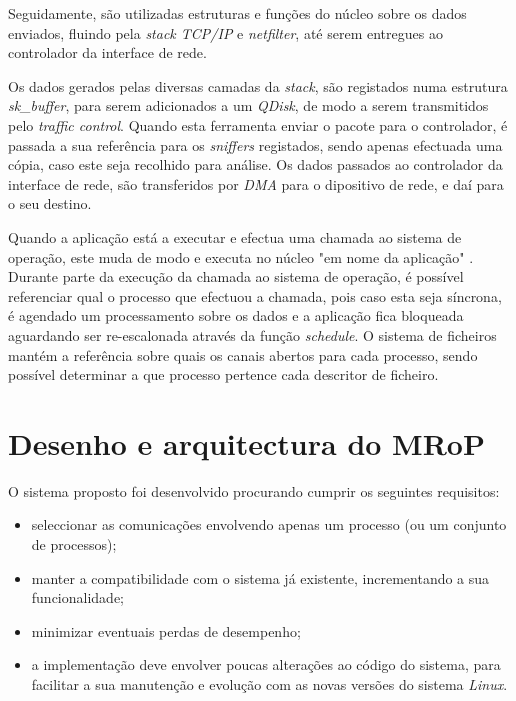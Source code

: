 Seguidamente, são utilizadas estruturas e funções do núcleo sobre os dados enviados, fluindo pela \textit{stack TCP/IP} e \textit{netfilter}, até serem entregues ao controlador da interface de rede.

Os dados gerados pelas diversas camadas da \textit{stack}, são registados numa estrutura \textit{sk\_buffer}, para serem adicionados a um \textit{QDisk}, de modo a serem transmitidos pelo \textit{traffic control}.
Quando esta ferramenta enviar o pacote para o controlador, é passada a sua referência para os \textit{sniffers} registados, sendo apenas efectuada uma cópia, caso este seja recolhido para análise.
Os dados passados ao controlador da interface de rede, são transferidos por \textit{DMA} para o dipositivo de rede, e daí para o seu destino.

Quando a aplicação está a executar e efectua uma chamada ao sistema de operação, este muda de modo e executa no núcleo \color{red} "em nome da aplicação" \color{black}.
Durante parte da execução da chamada ao sistema de operação, é possível referenciar qual o processo que efectuou a chamada, pois caso esta seja síncrona, é agendado um processamento sobre os dados e a aplicação fica bloqueada aguardando ser re-escalonada através da função \textit{schedule}.
O sistema de ficheiros mantém a referência sobre quais os canais abertos para cada processo, sendo possível determinar a que processo pertence cada descritor de ficheiro. 

\section{Desenho e arquitectura do MRoP}
\label{sec:mrop_architecture}

O sistema proposto foi desenvolvido procurando cumprir os seguintes requisitos:
\begin{itemize}
\item seleccionar as comunicações envolvendo apenas um processo (ou um conjunto de processos);
\item manter a compatibilidade com o sistema já existente, incrementando a sua funcionalidade;
\item minimizar eventuais perdas de desempenho;
\item a implementação deve envolver poucas alterações ao código do sistema, para facilitar a sua manutenção e evolução com as novas versões do sistema \textit{Linux}.
\end{itemize}

